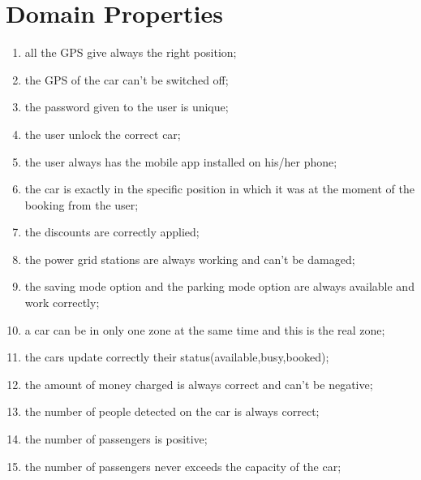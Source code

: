 \section{Domain Properties}
\begin{enumerate}
	\item all the GPS give always the right position;
	\item the GPS of the car can't be switched off;
	\item the password given to the user is unique;
	\item the user unlock the correct car;
	\item the user always has the mobile app installed on his/her phone;
	\item the car is exactly in the specific position in which it was at the moment of the booking from the user;
	\item the discounts are correctly applied;
	\item the power grid stations are always working and can't be damaged;
	\item the saving mode option and the parking mode option are always available and work correctly;
	\item a car can be in only one zone at the same time and this is the real zone;
	\item the cars update correctly their status(available,busy,booked);
    \item the amount of money charged is always correct and can't be negative;
    \item the number of people detected on the car is always correct;
    \item the number of passengers is positive;
    \item the number of passengers never exceeds the capacity of the car;

    
  
   
    
\end{enumerate}
